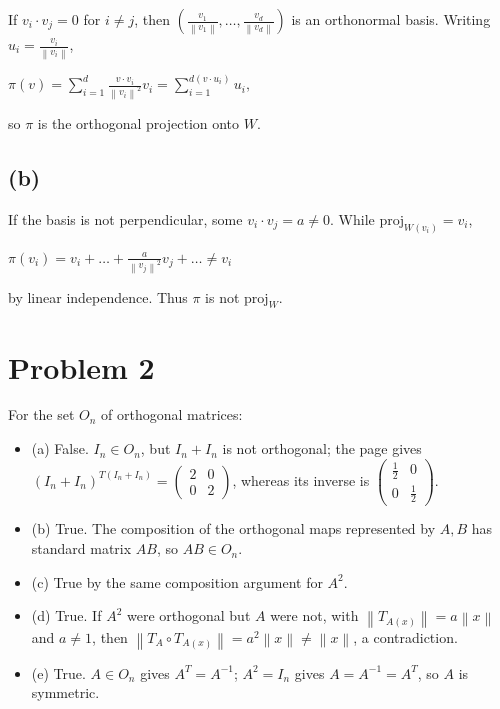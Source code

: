 If \(v_{i} \cdot v_{j} = 0\) for \(i \neq j\), then \(\left( {\frac{v_{1}}{\left\| v_{1} \right\|},\ldots,\frac{v_{d}}{\left\| v_{d} \right\|}} \right)\) is an orthonormal basis. Writing \(u_{i} = \frac{v_{i}}{\left\| v_{i} \right\|}\),

\(\pi(v) = \sum_{i = 1}^{d}\frac{v \cdot v_{i}}{\left\| v_{i} \right\|^{2}}v_{i} = \sum_{i = 1}^{d{({v \cdot u_{i}})}}u_{i},\)

so \(\pi\) is the orthogonal projection onto \(W\).

\subsection{(b)}

If the basis is not perpendicular, some \(v_{i} \cdot v_{j} = a \neq 0\). While \(\text{proj}_{W{(v_{i})}} = v_{i}\),

\(\pi\left( v_{i} \right) = v_{i} + \ldots + \frac{a}{\left\| v_{j} \right\|^{2}}v_{j} + \ldots \neq v_{i}\)

by linear independence. Thus \(\pi\) is not \(\text{proj}_{W}\).

\section{Problem 2}

For the set \(O_{n}\) of orthogonal matrices:

\begin{itemize}
\tightlist
\item
  (a) False. \(I_{n} \in O_{n}\), but \(I_{n} + I_{n}\) is not orthogonal; the page gives \(\left( {I_{n} + I_{n}} \right)^{T{({I_{n} + I_{n}})}} = \begin{pmatrix}
  2 & 0 \\
  0 & 2
  \end{pmatrix}\), whereas its inverse is \(\begin{pmatrix}
  \frac{1}{2} & 0 \\
  0 & \frac{1}{2}
  \end{pmatrix}\).
\item
  (b) True. The composition of the orthogonal maps represented by \(A,B\) has standard matrix \(AB\), so \(AB \in O_{n}\).
\item
  (c) True by the same composition argument for \(A^{2}\).
\item
  (d) True. If \(A^{2}\) were orthogonal but \(A\) were not, with \(\left\| T_{A{(x)}} \right\| = a\left\| x \right\|\) and \(a \neq 1\), then \(\left\| {T_{A} \circ T_{A{(x)}}} \right\| = a^{2}\left\| x \right\| \neq \left\| x \right\|\), a contradiction.
\item
  (e) True. \(A \in O_{n}\) gives \(A^{T} = A^{- 1}\); \(A^{2} = I_{n}\) gives \(A = A^{- 1} = A^{T}\), so \(A\) is symmetric.
\end{itemize}

